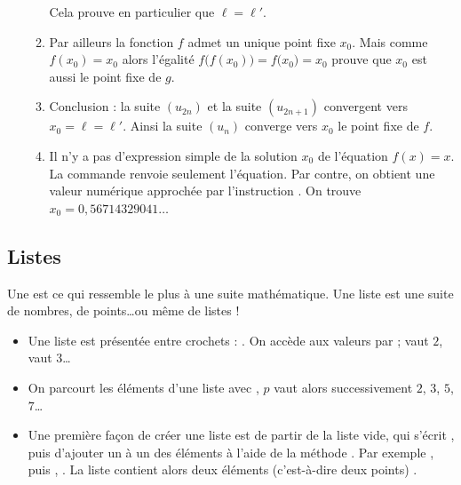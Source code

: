 \documentclass[class=report,crop=false]{standalone}
\begin{document}
\begin{enumerate}
\begin{enumerate}
  Cela prouve en particulier que $\ell=\ell'$.


  \item  Par ailleurs la fonction $f$ admet un unique point fixe $x_0$.
  Mais comme $f(x_0)=x_0$ alors l'égalité $f\big( f(x_0) \big) = f\big(x_0\big) = x_0$
  prouve que $x_0$ est aussi le point fixe de $g$.
  
  \item Conclusion : la suite $(u_{2n})$ et la suite $(u_{2n+1})$ convergent
  vers $x_0=\ell=\ell'$. Ainsi la suite $(u_n)$ converge vers $x_0$ le point fixe de $f$.

  
  \item Il n'y a pas d'expression simple de la solution $x_0$ de l'équation $f(x)=x$.
  La commande  renvoie seulement l'équation.
  Par contre, on obtient une valeur numérique approchée par l'instruction 
  . On trouve $x_0 = 0,56714329041\ldots$
  
\end{enumerate}
\end{enumerate}


\subsection{Listes}

Une  est ce qui ressemble le plus à une suite mathématique.
Une liste est une suite de nombres, de points\ldots ou même de listes !

\begin{itemize}
  
  \item Une liste est présentée entre crochets :
  . 
  On accède aux valeurs par  ;
   vaut $2$,   vaut $3$\ldots
  

  \item On parcourt les éléments d'une liste avec , 
  $p$ vaut alors successivement $2$, $3$, $5$, $7$\ldots
  
  \item Une première façon de créer une liste est de partir de la liste vide, 
  qui s'écrit \codeinline{[]},
  puis d'ajouter un à un des éléments à l'aide de la méthode . 
  Par exemple , puis ,
  . La liste  contient alors deux
  éléments (c'est-à-dire deux points)  \codeinline{[ (2,3), (7,-1) ]}.

\end{itemize}
  
\end{document}
